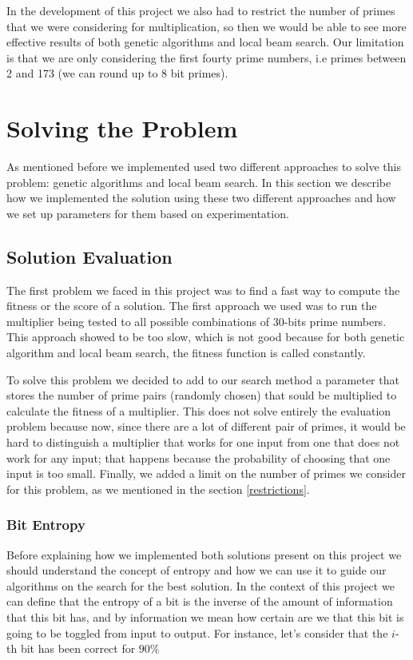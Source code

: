 \documentclass[12pt]{article}
\begin{document}
In the development of this project we also had to restrict the number of primes that we were considering for multiplication, so then we would be able to see more effective results of both genetic algorithms and local beam search. Our limitation is that we are only considering the first fourty prime numbers, i.e primes between 2 and 173 (we can round up to 8 bit primes).

\section{Solving the Problem}
As mentioned before we implemented used two different approaches to solve this problem: genetic algorithms and local beam search. In this section we describe how we implemented the solution using these two different approaches and how we set up parameters for them based on experimentation.

\subsection{Solution Evaluation}
The first problem we faced in this project was to find a fast way to compute the fitness or the score of a solution. The first approach we used was to run the multiplier being tested to all possible combinations of 30-bits prime numbers. This approach showed to be too slow, which is not good because for both genetic algorithm and local beam search, the fitness function is called constantly.

To solve this problem we decided to add to our search method a parameter that stores the number of prime pairs (randomly chosen) that sould be multiplied to calculate the fitness of a multiplier. This does not solve entirely the evaluation problem because now, since there are a lot of different pair of primes, it would be hard to distinguish a multiplier that works for one input from one that does not work for any input; that happens because the probability of choosing that one input is too small. Finally, we added a limit on the number of primes we consider for this problem, as we mentioned in the section \ref{restrictions}.

\subsubsection{Bit Entropy}
Before explaining how we implemented both solutions present on this project we should understand the concept of entropy and how we can use it to guide our algorithms on the search for the best solution. In the context of this project we can define that the entropy of a bit is the inverse of the amount of information that this bit has, and by information we mean how certain are we that this bit is going to be toggled from input to output. For instance, let's consider that the $i$-th bit has been correct for $90\%$
\end{document}
